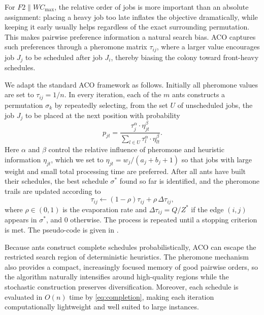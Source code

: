 \documentclass[12pt]{article}
\begin{document}
\begin{sloppypar}
For $F2 \parallel W C_{\max}$, the relative order of jobs is more important than an
absolute assignment: placing a heavy job too late inflates the objective dramatically, while
keeping it early usually helps regardless of the exact surrounding permutation. This makes
pairwise preference information a natural search bias. ACO captures such preferences through
a pheromone matrix $\tau_{ij}$, where a larger value encourages job $J_j$ to be scheduled
after job $J_i$, thereby biasing the colony toward front-heavy schedules.

We adapt the standard ACO framework as follows. Initially all pheromone values are set to
$\tau_{ij}=1/n$. In every iteration, each of the $m$ ants constructs a permutation
$\sigma_k$ by repeatedly selecting, from the set $U$ of unscheduled jobs, the job $J_j$ to be
placed at the next position with probability
\[
p_{jt}=\frac{\tau_{j}^{\alpha}\cdot\eta_{jt}^{\beta}}{\sum_{l\in U}\tau_{l}^{\alpha}\cdot\eta_{lt}^{\beta}}.
\]
Here $\alpha$ and $\beta$ control the relative influence of pheromone and heuristic
information $\eta_{jt}$, which we set to $\eta_{jt}=w_j/(a_j+b_j+1)$ so that jobs with large
weight and small total processing time are preferred. After all ants have built their
schedules, the best schedule $\sigma^{*}$ found so far is identified, and the pheromone
trails are updated according to
\[
\tau_{ij}\gets(1-\rho)\tau_{ij}+\rho\,\Delta\tau_{ij},
\]
where $\rho\in(0,1)$ is the evaporation rate and $\Delta\tau_{ij}=Q/Z^{*}$ if the edge
$(i,j)$ appears in $\sigma^{*}$, and $0$ otherwise. The process is repeated until a stopping
criterion is met. The pseudo-code is given in .

Because ants construct complete schedules probabilistically, ACO can escape the restricted
search region of deterministic heuristics. The pheromone mechanism also provides a compact,
increasingly focused memory of good pairwise orders, so the algorithm naturally intensifies
around high-quality regions while the stochastic construction preserves diversification.
Moreover, each schedule is evaluated in $O(n)$ time by \cref{eq:completion}, making each
iteration computationally lightweight and well suited to large instances.


\end{sloppypar}
\end{document}
